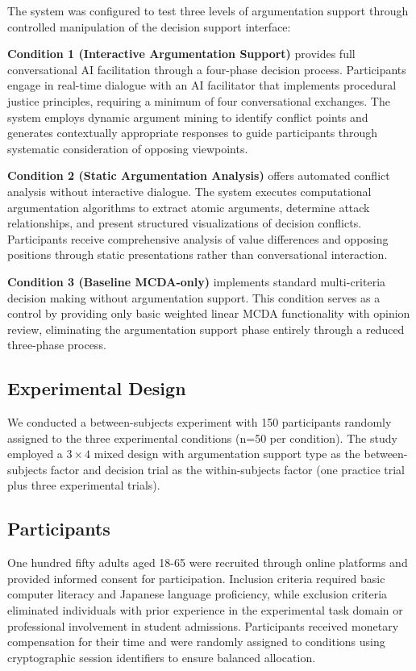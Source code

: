 \documentclass[conference]{IEEEtran}
\begin{document}
The system was configured to test three levels of argumentation support through controlled manipulation of the decision support interface:

\textbf{Condition 1 (Interactive Argumentation Support)} provides full conversational AI facilitation through a four-phase decision process. Participants engage in real-time dialogue with an AI facilitator that implements procedural justice principles, requiring a minimum of four conversational exchanges. The system employs dynamic argument mining to identify conflict points and generates contextually appropriate responses to guide participants through systematic consideration of opposing viewpoints.

\textbf{Condition 2 (Static Argumentation Analysis)} offers automated conflict analysis without interactive dialogue. The system executes computational argumentation algorithms to extract atomic arguments, determine attack relationships, and present structured visualizations of decision conflicts. Participants receive comprehensive analysis of value differences and opposing positions through static presentations rather than conversational interaction.

\textbf{Condition 3 (Baseline MCDA-only)} implements standard multi-criteria decision making without argumentation support. This condition serves as a control by providing only basic weighted linear MCDA functionality with opinion review, eliminating the argumentation support phase entirely through a reduced three-phase process.

\subsection{Experimental Design}

We conducted a between-subjects experiment with 150 participants randomly assigned to the three experimental conditions (n=50 per condition). The study employed a $3 \times 4$ mixed design with argumentation support type as the between-subjects factor and decision trial as the within-subjects factor (one practice trial plus three experimental trials).

\subsection{Participants}

One hundred fifty adults aged 18-65 were recruited through online platforms and provided informed consent for participation. Inclusion criteria required basic computer literacy and Japanese language proficiency, while exclusion criteria eliminated individuals with prior experience in the experimental task domain or professional involvement in student admissions. Participants received monetary compensation for their time and were randomly assigned to conditions using cryptographic session identifiers to ensure balanced allocation.
\end{document}

